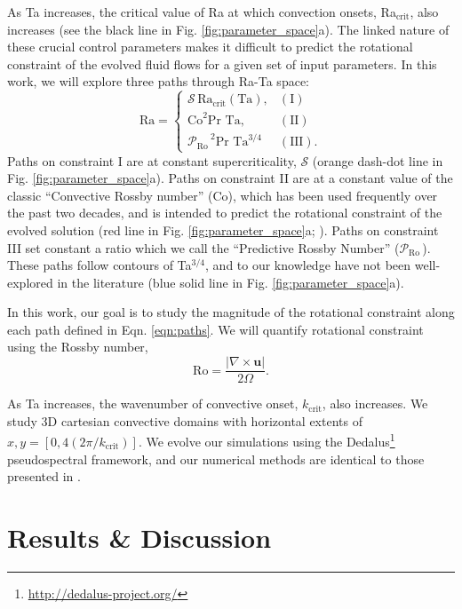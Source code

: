 \documentclass[twocolumn, amsmath, amsfonts, amssymb]{aastex62}
\newcommand{\grad}{\ensuremath{\nabla}}
\newcommand{\pro}{\ensuremath{\mathcal{P}_{\text{Ro}}\,}}
\begin{document}
As Ta increases, the critical value of Ra at which convection onsets,
Ra$_{\text{crit}}$, also increases (see the black line in Fig. \ref{fig:parameter_space}a). 
The linked nature of these crucial
control parameters makes it difficult to predict the rotational constraint of the evolved
fluid flows for a given set of input parameters. In this work, we will
explore three paths through Ra-Ta space:
\begin{equation}
\text{Ra} = 
\begin{cases}
\mathcal{S}\,\text{Ra}_\text{crit}(\text{Ta}), & (\text{I})\\
\text{Co}^2\text{Pr Ta}, & (\text{II}) \\
\pro^2 \text{Pr Ta}^{3/4} & (\text{III}).
\end{cases}
\label{eqn:paths}
\end{equation}
Paths on constraint I are at constant supercriticality, $\mathcal{S}$
(orange dash-dot line in Fig. \ref{fig:parameter_space}a).
Paths on constraint II are at a constant value of the classic
``Convective Rossby number'' (Co), which has been used frequently over the past
two decades, and is intended to predict the rotational constraint of the
evolved solution (red line in Fig. \ref{fig:parameter_space}a; 
\citet{julien&all1996, brummell&all1996}). Paths on constraint
III set constant a ratio which we call the ``Predictive Rossby Number'' (\pro).
These paths follow contours of Ta$^{3/4}$, and to our knowledge have not been
well-explored in the literature (blue solid line in Fig. \ref{fig:parameter_space}a).  




In this work, our goal is to study the magnitude of the rotational constraint
along each path defined in Eqn. \ref{eqn:paths}. We will quantify rotational
constraint using the Rossby number,
\begin{equation}
\text{Ro} = \frac{|\grad\times \bm{u}|}{2 \Omega}.
\label{eqn:ro}
\end{equation}

As Ta increases, the wavenumber of convective onset, $k_{\text{crit}}$, also increases. 
We study 3D cartesian convective domains with horizontal extents of
$x, y = [0, 4(2\pi/k_{\text{crit}})]$. 
We evolve our simulations using the Dedalus\footnote{\url{http://dedalus-project.org/}} 
pseudospectral framework, and our numerical methods are identical to those presented
in \AB.



\section{Results \& Discussion}
\end{document}
